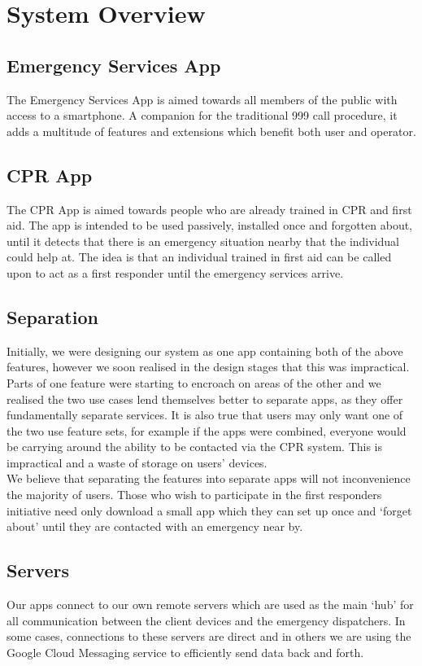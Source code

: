 \documentclass{article}
\begin{document}
\pagebreak
    \section{System Overview}
    \subsection{Emergency Services App}
    The Emergency Services App is aimed towards all members of the public with access to a smartphone. A companion for the traditional 999 call procedure, it adds a multitude of features and extensions which benefit both user and operator.
    \subsection{CPR App}
    The CPR App is aimed towards people who are already trained in CPR and first aid. The app is intended to be used passively, installed once and forgotten about, until it detects that there is an emergency situation nearby that the individual could help at. The idea is that an individual trained in first aid can be called upon to act as a first responder until the emergency services arrive.
    \subsection{Separation}
    Initially, we were designing our system as one app containing both of the above features, however we soon realised in the design stages that this was impractical. Parts of one feature were starting to encroach on areas of the other and we realised the two use cases lend themselves better to separate apps, as they offer fundamentally separate services. It is also true that users may only want one of the two use feature sets, for example if the apps were combined, everyone would be carrying around the ability to be contacted via the CPR system. This is impractical and a waste of storage on users' devices.\\
    
    We believe that separating the features into separate apps will not inconvenience the majority of users. Those who wish to participate in the first responders initiative need only download a small app which they can set up once and `forget about' until they are contacted with an emergency near by.
    \subsection{Servers}
    Our apps connect to our own remote servers which are used as the main `hub' for all communication between the client devices and the emergency dispatchers. In some cases, connections to these servers are direct and in others we are using the Google Cloud Messaging service to efficiently send data back and forth.
\end{document}
